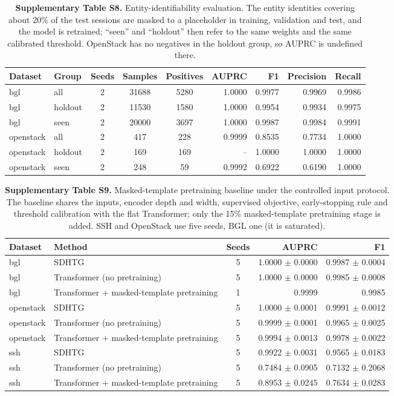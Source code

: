 \documentclass[11pt,a4paper]{article}
\begin{document}
\begin{table}[H]
\centering
\caption*{\textbf{Supplementary Table S8.} Entity-identifiability evaluation. The entity identities covering about 20\% of the test sessions are masked to a placeholder in training, validation and test, and the model is retrained; ``seen'' and ``holdout'' then refer to the same weights and the same calibrated threshold. OpenStack has no negatives in the holdout group, so AUPRC is undefined there.}
{\small
\begin{tabular}{llcccrrrr}
\toprule
Dataset & Group & Seeds & Samples & Positives & AUPRC & F1 & Precision & Recall \\
\midrule
bgl & all & 2 & 31688 & 5280 & 1.0000 & 0.9977 & 0.9969 & 0.9986 \\
bgl & holdout & 2 & 11530 & 1580 & 1.0000 & 0.9954 & 0.9934 & 0.9975 \\
bgl & seen & 2 & 20000 & 3697 & 1.0000 & 0.9987 & 0.9984 & 0.9991 \\
openstack & all & 2 & 417 & 228 & 0.9999 & 0.8535 & 0.7734 & 1.0000 \\
openstack & holdout & 2 & 169 & 169 & -- & 1.0000 & 1.0000 & 1.0000 \\
openstack & seen & 2 & 248 & 59 & 0.9992 & 0.6922 & 0.6190 & 1.0000 \\
\bottomrule
\end{tabular}
}
\end{table}

\begin{table}[H]
\centering
\caption*{\textbf{Supplementary Table S9.} Masked-template pretraining baseline under the controlled input protocol. The baseline shares the inputs, encoder depth and width, supervised objective, early-stopping rule and threshold calibration with the flat Transformer; only the 15\% masked-template pretraining stage is added. SSH and OpenStack use five seeds, BGL one (it is saturated).}
{\small
\begin{tabular}{llcrr}
\toprule
Dataset & Method & Seeds & AUPRC & F1 \\
\midrule
bgl & SDHTG & 5 & 1.0000 $\pm$ 0.0000 & 0.9987 $\pm$ 0.0004 \\
bgl & Transformer (no pretraining) & 5 & 1.0000 $\pm$ 0.0000 & 0.9985 $\pm$ 0.0008 \\
bgl & Transformer + masked-template pretraining & 1 & 0.9999 & 0.9985 \\
openstack & SDHTG & 5 & 1.0000 $\pm$ 0.0001 & 0.9991 $\pm$ 0.0012 \\
openstack & Transformer (no pretraining) & 5 & 0.9999 $\pm$ 0.0001 & 0.9965 $\pm$ 0.0025 \\
openstack & Transformer + masked-template pretraining & 5 & 0.9994 $\pm$ 0.0013 & 0.9978 $\pm$ 0.0022 \\
ssh & SDHTG & 5 & 0.9922 $\pm$ 0.0031 & 0.9565 $\pm$ 0.0183 \\
ssh & Transformer (no pretraining) & 5 & 0.7484 $\pm$ 0.0905 & 0.7132 $\pm$ 0.2068 \\
ssh & Transformer + masked-template pretraining & 5 & 0.8953 $\pm$ 0.0245 & 0.7634 $\pm$ 0.0283 \\
\bottomrule
\end{tabular}
}
\end{table}
\end{document}
